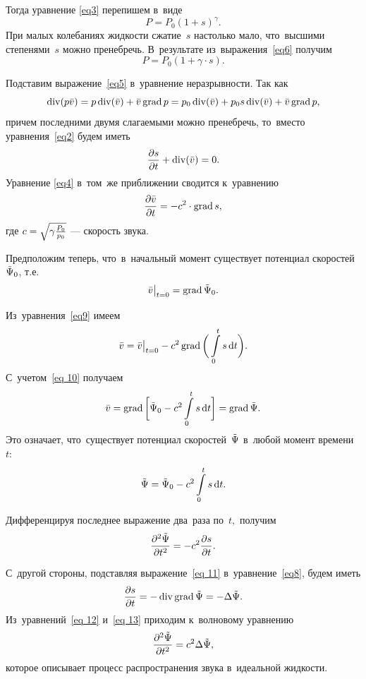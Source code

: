 Тогда уравнение \eqref{eq3} перепишем в~виде
\begin{equation}\label{eq6}
P=P_0(1+s)^\gamma.
\end{equation}
При малых колебаниях жидкости сжатие~$s$ настолько мало, что~высшими степенями~$s$ можно пренебречь. В~результате из~выражения~\eqref{eq6} получим
\begin{equation}\label{eq7}
P=P_0(1+\gamma \cdot s).
\end{equation}

Подставим выражение~\eqref{eq5} в~уравнение неразрывности. Так как 
$$
\diver(p \bar{v})= p\diver(\bar{v})+\bar{v} \grad p = p_0 \diver(\bar{v}) + p_0 s \diver(\bar{v}) + \bar{v} \grad p,
$$
причем последними двумя слагаемыми можно пренебречь, то~вместо уравнения~\eqref{eq2} будем иметь
\begin{equation}\label{eq8}
\fr{\de s}{\de t} + \diver (\bar{v}) = 0.
\end{equation}
Уравнение \eqref{eq4} в~том~же приближении сводится к~уравнению
\begin{equation}\label{eq9}
\fr{\de \bar{v}}{\de t} = -c^2\cdot\grad s,
\end{equation}
где $c=\sqrt{\gamma \fr{P_0}{p_0}}$ --- скорость звука.

Предположим теперь, что~в~начальный момент существует потенциал скоростей~$\tilde\P_0$, т.е.
\begin{equation}\label{eq 10}
\bar{v}\big|_{t=0}=\grad\tilde\P_0.
\end{equation}

Из~уравнения~\eqref{eq9} имеем
$$
\bar{v}=\bar{v}\big|_{t=0}-c^2\grad \bigg(\int\limits_{0}^{t} s\diff t\bigg).
$$
С~учетом~\eqref{eq 10} получаем
\begin{equation}\label{eq 11}
\bar{v}=\grad\bigg[\tilde\P_0-c^2\int\limits_{0}^{t} s\diff t\bigg]=\grad\tilde\P.
\end{equation}
Это означает, что~существует потенциал скоростей~$\tilde\P$ в~любой момент времени~$t:$
$$
\tilde\P=\tilde\P_0-c^2\int\limits_{0}^{t} s\diff t.
$$

Дифференцируя последнее выражение два~раза по~$t,$ получим
\begin{equation}\label{eq 12}
\fr{\de^2\tilde\P}{\de t^2}=-c^2\fr{\de s}{\de t}.
\end{equation}

С~другой стороны, подставляя выражение~\eqref{eq 11} в~уравнение~\eqref{eq8}, будем иметь
\begin{equation}\label{eq 13}
\fr{\de s}{\de t}=-\diver\grad\tilde\P=-\Lap\tilde\P.
\end{equation}
Из~уравнений~\eqref{eq 12} и~\eqref{eq 13} приходим к~волновому уравнению
\begin{equation}\label{eq 14}
\fr{\de^2\tilde\P}{\de t^2}=c^2\Lap\tilde\P,
\end{equation}
которое описывает процесс распространения звука в~идеальной жидкости.

